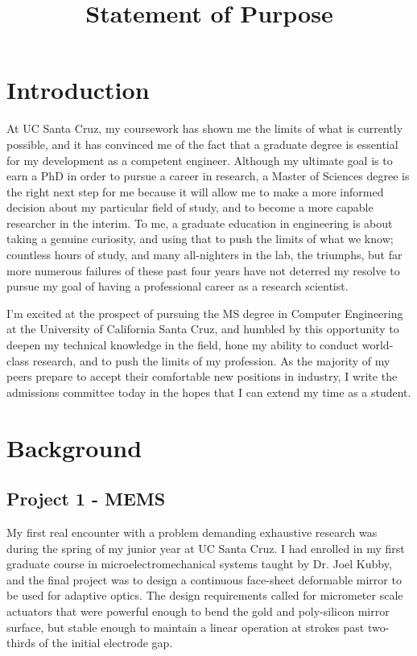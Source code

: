 \documentclass[journal]{IEEEtran}
\begin{document}
%
\title{Statement of Purpose}
\author{
}
\maketitle
\section{Introduction}
At UC Santa Cruz, my coursework has shown me the limits of what is currently possible, and it has convinced me of the fact that a graduate degree is essential for my development as a competent engineer. Although my ultimate goal is to earn a PhD in order to pursue a career in research, a Master of Sciences degree is the right next step for me because it will allow me to make a more informed decision about my particular field of study, and to become a more capable researcher in the interim. To me, a graduate education in engineering is about taking a genuine curiosity, and using that to push the limits of what we know; countless hours of study, and many all-nighters in the lab, the triumphs, but far more numerous failures of these past four years have not deterred my resolve to pursue my goal of having a professional career as a research scientist. 

I'm excited at the prospect of pursuing the MS degree in Computer Engineering at the University of California Santa Cruz, and humbled by this opportunity to deepen my technical knowledge in the field, hone my ability to conduct world-class research, and to push the limits of my profession. As the majority of my peers prepare to accept their comfortable new positions in industry, I write the admissions committee today in the hopes that I can extend my time as a student. 


\section{Background}
\subsection{Project 1 - MEMS}
My first real encounter with a problem demanding exhaustive research was during the spring of my junior year at UC Santa Cruz. I had enrolled in my first graduate course in microelectromechanical systems taught by Dr. Joel Kubby, and the final project was to design a continuous face-sheet deformable mirror to be used for adaptive optics. The design requirements called for micrometer scale actuators that were powerful enough to bend the gold and poly-silicon mirror surface, but stable enough to maintain a linear operation at strokes past two-thirds of the initial electrode gap. 
\end{document}
